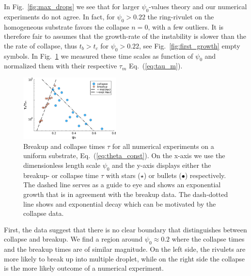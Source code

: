\documentclass[twoside,twocolumn,9pt]{article}
\begin{document}
In Fig.~\ref{fig:max_drops} we see that for larger $\psi_0$-values theory and our numerical experiments do not agree.
In fact, for $\psi_0 > 0.22$ the ring-rivulet on the homogeneous substrate favors the collapse $n = 0$, with a few outliers. 
It is therefore fair to assumes that the growth-rate of the instability is slower than the the rate of collapse, thus $t_b > t_c$ for $\psi_0 > 0.22$, see Fig.~\ref{fig:first_growth} empty symbols.
In Fig.~\ref{fig:timescaleDifference} we measured these time scales as function of $\psi_0$ and normalized them with their respective $\tau_m$ Eq.~(\ref{eq:tau_m}).
\begin{figure}
    \centering
    \includegraphics[width = 0.45\textwidth]{assets/uniform_timescales.pdf}
    \caption{Breakup and collapse times $\tau$ for all numerical experiments on a uniform substrate, Eq.~(\ref{eq:theta_const}).
        On the x-axis we use the dimensionless length scale $\psi_0$ and the y-axis displays either the breakup- or collapse time $\tau$ with stars (\textcolor{jlorange}{$\star$}) or bullets (\textcolor{jlblue}{$\bullet$}) respectively.
        The dashed line serves as a guide to eye and shows an exponential growth that is in agreement with the breakup data. 
        The dash-dotted line shows and exponential decay which can be motivated by the collapse data.
        }
    \label{fig:timescaleDifference}
\end{figure}
First, the data suggest that there is no clear boundary that distinguishes between collapse and breakup.
We find a region around $\psi_0 \approx 0.2$ where the collapse times and the breakup times are of similar magnitude.
On the left side, the rivulets are more likely to break up into multiple droplet, while on the right side the collapse is the more likely outcome of a numerical experiment.
\end{document}
